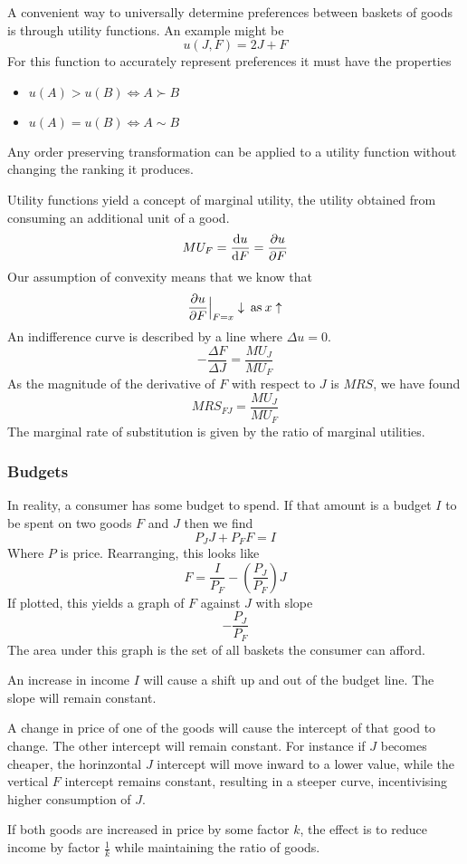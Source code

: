 \documentclass[12pt]{report}
\begin{document}
\begin{flushleft}
A convenient way to universally determine preferences between baskets of goods
is through utility functions. An example might be
\[u(J, F) = 2J + F\]
For this function to accurately represent preferences it must have the
properties
\begin{itemize}
    \item \(u(A) > u(B) \Leftrightarrow A \succ B\)
    \item \(u(A) = u(B) \Leftrightarrow A \sim B\)
\end{itemize}
Any order preserving transformation can be applied to a utility function without
changing the ranking it produces. \par
Utility functions yield a concept of marginal utility, the utility obtained from
consuming an additional unit of a good.
\[MU_F = \frac{\mathrm{d}u}{\mathrm{d}F} = \frac{\partial u}{\partial F}\]
Our assumption of convexity means that we know that
\[\frac{\partial u}{\partial F}\Bigr\rvert_{F = x} \downarrow \:\mathrm{as}\: x \uparrow\]
An indifference curve is described by a line where \(\Delta u = 0\).
\[-\frac{\Delta F}{\Delta J} = \frac{MU_J}{MU_F}\]
As the magnitude of the derivative of \(F\) with respect to \(J\) is \(MRS\),
we have found
\[MRS_{FJ} = \frac{MU_J}{MU_F}\]
The marginal rate of substitution is given by the ratio of marginal utilities.

\subsubsection*{Budgets}

In reality, a consumer has some budget to spend. If that amount is a budget
\(I\) to be spent on two goods \(F\) and \(J\) then we find
\[P_JJ + P_FF = I\]
Where \(P\) is price. Rearranging, this looks like
\[F = \frac{I}{P_F} - \left(\frac{P_J}{P_F}\right)J\]
If plotted, this yields a graph of \(F\) against \(J\) with slope
\[-\frac{P_J}{P_F}\]
The area under this graph is the set of all baskets the consumer can afford.
\par
An increase in income \(I\) will cause a shift up and out of the budget line.
The slope will remain constant. \par
A change in price of one of the goods will cause the intercept of that good to
change. The other intercept will remain constant. For instance if \(J\)
becomes cheaper, the horinzontal \(J\) intercept will move inward to a lower
value, while the vertical \(F\) intercept remains constant, resulting in a
steeper curve, incentivising higher consumption of \(J\). \par
If both goods are increased in price by some factor \(k\), the effect is to
reduce income by factor \(\frac{1}{k}\) while maintaining the ratio of goods.

\end{flushleft}
\end{document}
